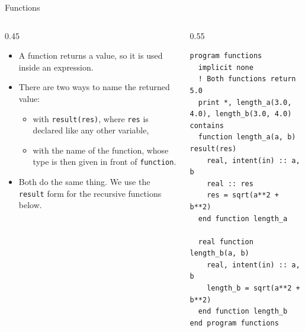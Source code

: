 \begin{frame}[fragile]{Functions}
  \begin{columns}[T]
    \begin{column}{0.45\textwidth}
      \begin{itemize}
        \item A function returns a value, so it is used inside an expression.
        \item There are two ways to name the returned value:
          \begin{itemize}
            \item with \texttt{result(res)}, where \texttt{res} is declared like any other variable,
            \item with the name of the function, whose type is then given in front of \texttt{function}.
          \end{itemize}
        \item Both do the same thing. We use the \texttt{result} form for the recursive functions below.
      \end{itemize}
    \end{column}

    \begin{column}{0.55\textwidth}
      \begin{lstlisting}
program functions
  implicit none
  ! Both functions return 5.0
  print *, length_a(3.0, 4.0), length_b(3.0, 4.0)
contains
  function length_a(a, b) result(res)
    real, intent(in) :: a, b
    real :: res
    res = sqrt(a**2 + b**2)
  end function length_a

  real function length_b(a, b)
    real, intent(in) :: a, b
    length_b = sqrt(a**2 + b**2)
  end function length_b
end program functions
      \end{lstlisting}
    \end{column}
  \end{columns}
\end{frame}


